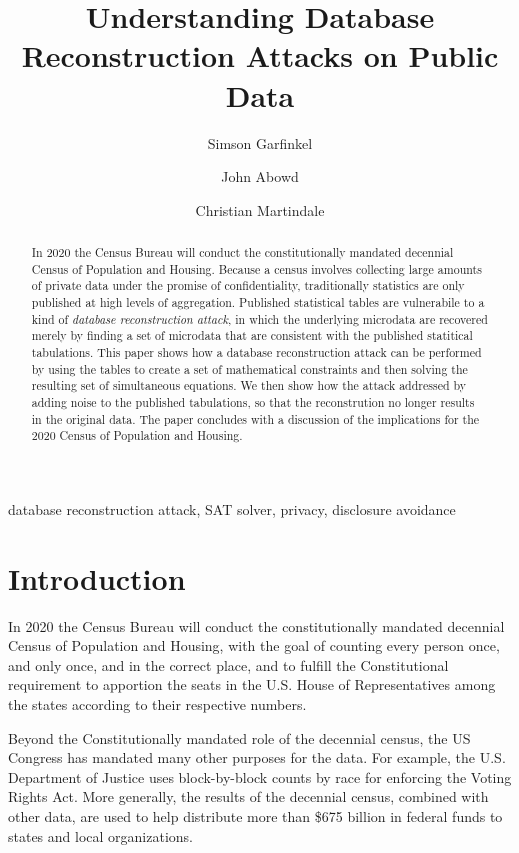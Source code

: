 \documentclass[runningheads]{llncs}
\begin{document}
\title{Understanding Database Reconstruction Attacks on Public Data}
\author{Simson Garfinkel \and John Abowd \and Christian Martindale }

\maketitle
\begin{abstract}
In 2020 the Census Bureau will conduct the constitutionally mandated
decennial Census of Population and Housing. Because a census involves
collecting large amounts of private data under the promise of
confidentiality, traditionally statistics are only published at high
levels of aggregation.  Published statistical tables are vulnerabile
to a kind of \emph{database reconstruction attack}, in which the
underlying microdata are recovered merely by finding a set of
microdata that are consistent with the published statitical
tabulations. This paper shows how a database reconstruction attack can
be performed by using the tables to create a set of mathematical
constraints and then solving the resulting set of simultaneous
equations.  We then show how the attack addressed by adding noise to
the published tabulations, so that the reconstrution no longer results
in the original data. The paper concludes with a discussion of the
implications for the 2020 Census of Population and Housing.
\end{abstract}

\begin{keywords}
database reconstruction attack, SAT solver, privacy, disclosure avoidance
\end{keywords}

\section{Introduction}
In 2020 the Census Bureau will conduct the constitutionally mandated
decennial Census of Population and Housing, with the goal of counting
every person once, and only once, and in the correct place, and to
fulfill the Constitutional requirement to apportion the seats in the
U.S. House of Representatives among the states according to their
respective numbers.

Beyond the Constitutionally mandated role of the decennial census, the
US Congress has mandated many other purposes for the data. For
example, the U.S. Department of Justice uses block-by-block counts by
race for enforcing the Voting Rights Act. More generally, the results
of the decennial census, combined with other data, are used to help
distribute more than \$675 billion in federal funds to states and
local organizations.
\end{document}
